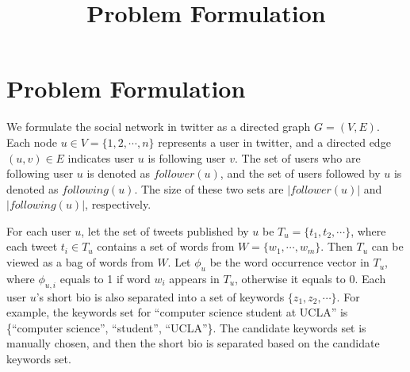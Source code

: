 \documentclass{article}
\begin{document}
\title{Problem Formulation}
\maketitle \else \fi

\newcommand{\following}{\ensuremath{following}}
\newcommand{\follower}{\ensuremath{follower}}

\section{Problem Formulation}\label{sec:problem}
We formulate the social network in twitter as a directed graph $G = (V,E)$.
Each node $u \in V = \{1, 2, \cdots, n\}$ represents a user in twitter, and a directed edge $(u,v) \in E$ indicates
user $u$ is following user $v$. The set of users who are following user $u$ is denoted as $\follower(u)$, and the set of users followed by $u$ is denoted as $\following(u)$. The size of these two sets are $|\follower(u)|$ and $|\following(u)|$, respectively.

For each user $u$, let the set of tweets published by $u$ be $T_u = \{t_1, t_2, \cdots\}$, where each tweet $t_i \in T_u$ contains a set of words from $W = \{w_1, \cdots, w_m\}$. Then $T_u$ can be viewed as a bag of words from $W$. Let $\phi_u$ be the word occurrence vector in $T_u$, where $\phi_{u, i}$ equals to 1 if word $w_i$ appears in $T_u$, otherwise it equals to 0.
Each user $u$'s short bio is also separated into a set of keywords $\{z_1, z_2, \cdots\}$. For example, the keywords set for ``computer science student at UCLA'' is \{``computer science'', ``student'', ``UCLA''\}. The candidate keywords set is manually chosen, and then the short bio is separated based on the candidate keywords set.

\end{document}

